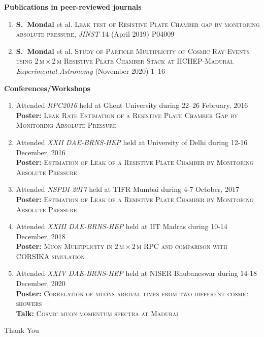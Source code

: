 \documentclass{beamer}
\begin{document}
\begin{frame}[shrink]
  \footnotesize{
    \colorbox{gray!40}{\begin{minipage}{1.0\textwidth}%
        \bf {Publications in peer-reviewed journals} 
    \end{minipage} }
    \begin{minipage}{1.10\textwidth}
      \begin{enumerate}
      \item {\bf S.~Mondal} et al. \textsc{Leak test of Resistive Plate Chamber gap by monitoring absolute pressure}, \textit{JINST} 14 (April 2019) P04009
      \item \textbf{S.~Mondal} et al. \textsc{Study of Particle Multiplicity of Cosmic Ray Events using 2\,m\,$\times$\,2\,m Resistive Plate Chamber Stack at IICHEP-Madurai}. \textit{Experimental Astronomy} (November 2020) 1--16
      \end{enumerate} 
    \end{minipage}
    \colorbox{gray!40}{\begin{minipage}{1.0\textwidth}%
        \bf {Conferences/Workshops} 
    \end{minipage} }
    \begin{minipage}{1.10\textwidth}%
      \begin{enumerate}
      \item Attended \emph{RPC2016} held at Ghent University during 22--26 February, 2016 \\
        {\bf{Poster:}} \textsc{Leak Rate Estimation of a Resistive Plate Chamber Gap by Monitoring Absolute Pressure}
      \item Attended \emph{XXII DAE-BRNS-HEP}  held at University of Delhi during 12-16 December, 2016 \\
        {\bf{Poster:}} \textsc{Estimation of Leak of a Resistive Plate Chamber by Monitoring Absolute Pressure}
      \item Attended \emph{NSPDI 2017} held at TIFR Mumbai during 4-7 October, 2017 \\
        {\bf{Poster:}} \textsc{Estimation of Leak of a Resistive Plate Chamber by Monitoring Absolute Pressure}
      \item Attended \emph{XXIII DAE-BRNS-HEP}  held at IIT Madras during 10-14 December, 2018 \\
        {\bf{Poster:}} \textsc{Muon Multiplicity in $2$\,m\,$\times$\,2\,m RPC and comparison with CORSIKA simulation}
      \item Attended \emph{XXIV DAE-BRNS-HEP}  held at NISER Bhubaneswar during 14-18 December, 2020 \\
        {\bf{Poster:}} \textsc{Correlation of muons arrival times from two different cosmic showers}\\
        {\bf{Talk:}} \textsc{Cosmic muon momentum spectra at Madurai}
      \end{enumerate}
    \end{minipage}
  }
\end{frame}

\begin{frame}
  \centering
  Thank You
\end{frame}
\end{document}
